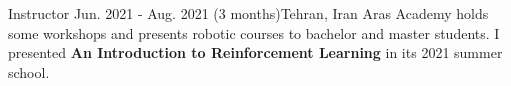 \resumeSubheadingReza
{Instructor}{}
{Jun. 2021 - Aug. 2021 (3 months)}{Tehran, Iran}
{Aras Academy holds some workshops and presents robotic courses to bachelor and master students. I presented \textbf{An Introduction to Reinforcement Learning} in its 2021 summer school.}